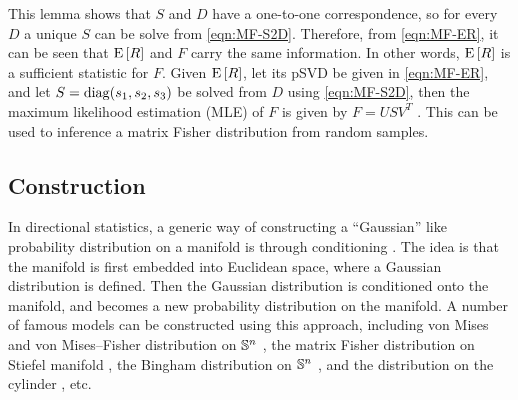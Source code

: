 This lemma shows that $S$ and $D$ have a one-to-one correspondence, so for every $D$ a unique $S$ can be solve from \eqref{eqn:MF-S2D}.
Therefore, from \eqref{eqn:MF-ER}, it can be seen that $\mathrm{E}\left[ R \right]$ and $F$ carry the same information.
In other words, $\mathrm{E}\left[ R \right]$ is a sufficient statistic for $F$.
Given $\mathrm{E}\left[ R \right]$, let its pSVD be given in \eqref{eqn:MF-ER}, and let $S = \mathrm{diag}(s_1,s_2,s_3)$ be solved from $D$ using \eqref{eqn:MF-S2D},
then the maximum likelihood estimation (MLE) of $F$ is given by $F=USV^T$ \cite{khatri1977mises,lee2018bayesian}.
This can be used to inference a matrix Fisher distribution from random samples.

\subsection{Construction}

In directional statistics, a generic way of constructing a ``Gaussian'' like probability distribution on a manifold is through conditioning \cite{pewsey2021recent}.
The idea is that the manifold is first embedded into Euclidean space, where a Gaussian distribution is defined.
Then the Gaussian distribution is conditioned onto the manifold, and becomes a new probability distribution on the manifold.
A number of famous models can be constructed using this approach, including von Mises and von Mises--Fisher distribution on $\mathbb{S}^n$ \cite{mardia2009directional}, the matrix Fisher distribution on Stiefel manifold \cite{downs1972orientation}, the Bingham distribution on $\mathbb{S}^n$ \cite{bingham1974antipodally}, and the distribution on the cylinder \cite{mardia1978model}, etc.

